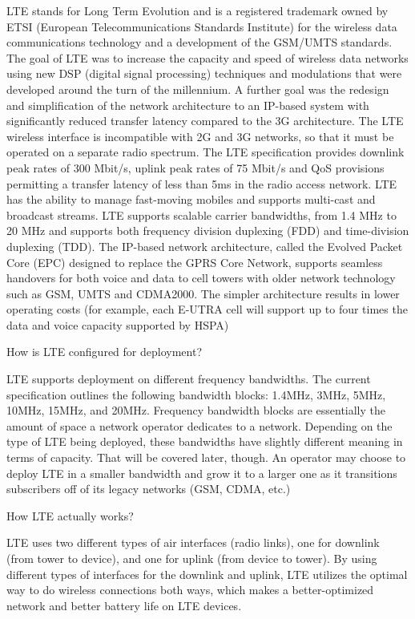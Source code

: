 \documentclass[12pt,onecolumn]{IEEEtran}
\begin{document}
     LTE stands for Long Term Evolution and is a registered trademark owned by ETSI (European Telecommunications Standards Institute) for the wireless data communications technology and a development of the GSM/UMTS standards. The goal of LTE was to increase the capacity and speed of wireless data networks using new DSP (digital signal processing) techniques and modulations that were developed around the turn of the millennium. A further goal was the redesign and simplification of the network architecture to an IP-based system with significantly reduced transfer latency compared to the 3G architecture. The LTE wireless interface is incompatible with 2G and 3G networks, so that it must be operated on a separate radio spectrum. The LTE specification provides downlink peak rates of 300 Mbit/s, uplink peak rates of 75 Mbit/s and QoS provisions permitting a transfer latency of less than 5ms in the radio access network. LTE has the ability to manage fast-moving mobiles and supports multi-cast and broadcast streams. LTE supports scalable carrier bandwidths, from 1.4 MHz to 20 MHz and supports both frequency division duplexing (FDD) and time-division duplexing (TDD). The IP-based network architecture, called the Evolved Packet Core (EPC) designed to replace the GPRS Core Network, supports seamless handovers for both voice and data to cell towers with older network technology such as GSM, UMTS and CDMA2000. The simpler architecture results in lower operating costs (for example, each E-UTRA cell will support up to four times the data and voice capacity supported by HSPA)

How is LTE configured for deployment?

LTE supports deployment on different frequency bandwidths. The current specification outlines the following bandwidth blocks: 1.4MHz, 3MHz, 5MHz, 10MHz, 15MHz, and 20MHz. Frequency bandwidth blocks are essentially the amount of space a network operator dedicates to a network. Depending on the type of LTE being deployed, these bandwidths have slightly different meaning in terms of capacity. That will be covered later, though. An operator may choose to deploy LTE in a smaller bandwidth and grow it to a larger one as it transitions subscribers off of its legacy networks (GSM, CDMA, etc.)

How LTE actually works?

LTE uses two different types of air interfaces (radio links), one for downlink (from tower to device), and one for uplink (from device to tower). By using different types of interfaces for the downlink and uplink, LTE utilizes the optimal way to do wireless connections both ways, which makes a better-optimized network and better battery life on LTE devices.
\end{document}
